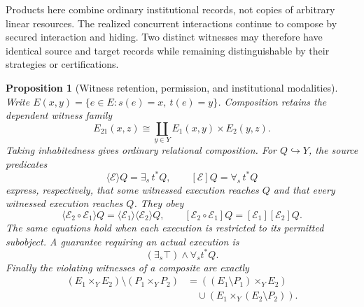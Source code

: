 \documentclass[11pt,a4paper]{article}
\numberwithin{equation}{section}
\newtheorem{proposition}[theorem]{Proposition}
\theoremstyle{definition}
\theoremstyle{remark}
\theoremstyle{plain}
\begin{document}
Products here combine ordinary institutional records, not copies
of arbitrary linear resources. The realized concurrent interactions
continue to compose by secured interaction and hiding. Two distinct
witnesses may therefore have identical source and target records while
remaining distinguishable by their strategies or certifications.

\begin{proposition}[Witness retention, permission, and institutional modalities]
\label{prop:egt-institution-modalities}
Write
$E(x,y)=\{e\in E:s(e)=x,\ t(e)=y\}$.
Composition retains the dependent witness family
\[
 E_{21}(x,z)\cong\coprod_{y\in Y}E_1(x,y)\times E_2(y,z).
\]
Taking inhabitedness gives ordinary relational composition.
For $Q\hookrightarrow Y$, the source predicates
\[
 \langle\mathcal E\rangle Q=\exists_s\,t^*Q,\qquad
 [\mathcal E]Q=\forall_s\,t^*Q
\]
express, respectively, that some witnessed execution reaches $Q$
and that every witnessed execution reaches $Q$. They obey
\[
 \langle\mathcal E_2\circ\mathcal E_1\rangle Q
   =\langle\mathcal E_1\rangle\langle\mathcal E_2\rangle Q,\qquad
 [\mathcal E_2\circ\mathcal E_1]Q
   =[\mathcal E_1][\mathcal E_2]Q.
\]
The same equations hold when each execution is restricted to its
permitted subobject. A guarantee requiring an actual execution is
\[
 (\exists_s\top)\wedge\forall_s t^*Q.
\]
Finally the violating witnesses of a composite are exactly
\[
 \begin{aligned}
 (E_1\times_YE_2)\setminus(P_1\times_YP_2)
 &=
 ((E_1\setminus P_1)\times_YE_2)\\
 &\quad{}\cup (E_1\times_Y(E_2\setminus P_2)).
 \end{aligned}
\]
\end{proposition}
\end{document}

